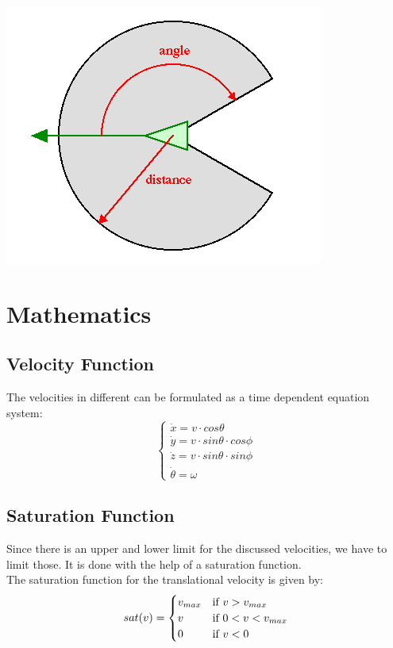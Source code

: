 \documentclass{article}
\begin{document}
\begin{center}
\includegraphics[scale=0.4]{neighbour.png} 
\end{center}

\section{Mathematics}

\subsection{Velocity Function}
The velocities in different can be formulated as a time dependent equation system:\\
\begin{equation}
    \begin{cases}
    \Dot{x} = v \cdot cos\theta \\
    \Dot{y} = v \cdot sin\theta \cdot cos \phi\\
    \Dot{z} = v \cdot sin\theta \cdot sin \phi\\
    \Dot{\theta} = \omega
    \end{cases}
\end{equation}

\subsection{Saturation Function}
Since there is an upper and lower limit for the discussed velocities, we have to limit those. It is done with the help of a saturation function.\\
The saturation function for the translational velocity is given by:\\
\begin{equation}
    sat(v)=\begin{cases}
    v_{max}  & $\text{if $v>v_{max}$}$\\
    v  & $\text{if $0<v<v_{max}$}$\\
    0  & $\text{if $v<0$}$
    \end{cases}
\end{equation}
\end{document}
